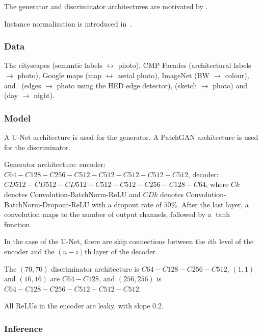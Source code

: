 \documentclass[a4paper, 12pt]{article}
\begin{document}
The generator and discriminator architectures are motivated by
\citet{DBLP:journals/corr/RadfordMC15}.

Instance normalization is introduced in~\citet{DBLP:journals/corr/UlyanovVL16}.

\subsubsection{Data}

The cityscapes\citet{Cordts_2016_CVPR} (semantic labels $\leftrightarrow$
photo), CMP Facades (architectural labels $\rightarrow$ photo), Google maps
(map $\leftrightarrow$ aerial photo),
ImageNet\citet{DBLP:journals/corr/RussakovskyDSKSMHKKBBF14} (BW $\rightarrow$
colour), \citet{zhu2016generative} and~\citet{fine-grained} (edges
$\rightarrow$ photo using the HED edge
detector\citet{DBLP:journals/corr/XieT15}),
\citet{Eitz:2012:HSO:2185520.2185540} (sketch $\rightarrow$ photo) and
\citet{Laffont14} (day $\rightarrow$ night).

\subsubsection{Model}

A U-Net\citet{DBLP:journals/corr/RonnebergerFB15} architecture is used for the
generator. A PatchGAN architecture\citet{DBLP:journals/corr/LiW16b} is used for
the discriminator.

Generator architecture: encoder: $C64-C128-C256-C512-C512-C512-C512-C512$,
decoder: $CD512-CD512-CD512-C512-C512-C256-C128-C64$, where $Ck$ denotes
Convolution-BatchNorm-ReLU and $CDk$ denotes
Convolution-BatchNorm-Dropout-ReLU with a dropout rate of $50\%$. After the
last layer, a convolution maps to the number of output channels, followed by a
$\tanh$ function.

In the case of the U-Net, there are skip connections between the $i$th level of
the encoder and the $(n - i)$th layer of the decoder.

The $(70, 70)$ discriminator architecture is $C64-C128-C256-C512$, $(1, 1)$ and
$(16, 16)$ are $C64-C128$, and $(256, 256)$ is $C64-C128-C256-C512-C512-C512$.

All ReLUs in the encoder are leaky, with slope 0.2.

\subsubsection{Inference}
\end{document}
